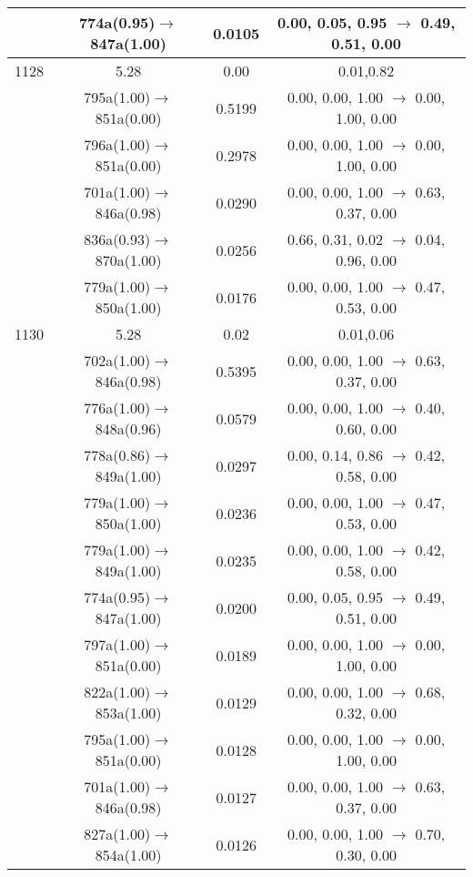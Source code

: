\documentclass[10pt,a4paper]{article}
\begin{document}
\begin{longtable}{c|c|c|c}
 	& 774a(0.95)$\rightarrow$847a(1.00) &	 0.0105 &	 0.00, 0.05, 0.95 $\rightarrow$ 0.49, 0.51, 0.00 \\ 
 \hline1128 &	 5.28 &	 0.00 &	 0.01,0.82 \\ 
  	& 795a(1.00)$\rightarrow$851a(0.00) &	 0.5199 &	 0.00, 0.00, 1.00 $\rightarrow$ 0.00, 1.00, 0.00 \\ 
 	& 796a(1.00)$\rightarrow$851a(0.00) &	 0.2978 &	 0.00, 0.00, 1.00 $\rightarrow$ 0.00, 1.00, 0.00 \\ 
 	& 701a(1.00)$\rightarrow$846a(0.98) &	 0.0290 &	 0.00, 0.00, 1.00 $\rightarrow$ 0.63, 0.37, 0.00 \\ 
 	& 836a(0.93)$\rightarrow$870a(1.00) &	 0.0256 &	 0.66, 0.31, 0.02 $\rightarrow$ 0.04, 0.96, 0.00 \\ 
 	& 779a(1.00)$\rightarrow$850a(1.00) &	 0.0176 &	 0.00, 0.00, 1.00 $\rightarrow$ 0.47, 0.53, 0.00 \\ 
 \hline1130 &	 5.28 &	 0.02 &	 0.01,0.06 \\ 
  	& 702a(1.00)$\rightarrow$846a(0.98) &	 0.5395 &	 0.00, 0.00, 1.00 $\rightarrow$ 0.63, 0.37, 0.00 \\ 
 	& 776a(1.00)$\rightarrow$848a(0.96) &	 0.0579 &	 0.00, 0.00, 1.00 $\rightarrow$ 0.40, 0.60, 0.00 \\ 
 	& 778a(0.86)$\rightarrow$849a(1.00) &	 0.0297 &	 0.00, 0.14, 0.86 $\rightarrow$ 0.42, 0.58, 0.00 \\ 
 	& 779a(1.00)$\rightarrow$850a(1.00) &	 0.0236 &	 0.00, 0.00, 1.00 $\rightarrow$ 0.47, 0.53, 0.00 \\ 
 	& 779a(1.00)$\rightarrow$849a(1.00) &	 0.0235 &	 0.00, 0.00, 1.00 $\rightarrow$ 0.42, 0.58, 0.00 \\ 
 	& 774a(0.95)$\rightarrow$847a(1.00) &	 0.0200 &	 0.00, 0.05, 0.95 $\rightarrow$ 0.49, 0.51, 0.00 \\ 
 	& 797a(1.00)$\rightarrow$851a(0.00) &	 0.0189 &	 0.00, 0.00, 1.00 $\rightarrow$ 0.00, 1.00, 0.00 \\ 
 	& 822a(1.00)$\rightarrow$853a(1.00) &	 0.0129 &	 0.00, 0.00, 1.00 $\rightarrow$ 0.68, 0.32, 0.00 \\ 
 	& 795a(1.00)$\rightarrow$851a(0.00) &	 0.0128 &	 0.00, 0.00, 1.00 $\rightarrow$ 0.00, 1.00, 0.00 \\ 
 	& 701a(1.00)$\rightarrow$846a(0.98) &	 0.0127 &	 0.00, 0.00, 1.00 $\rightarrow$ 0.63, 0.37, 0.00 \\ 
 	& 827a(1.00)$\rightarrow$854a(1.00) &	 0.0126 &	 0.00, 0.00, 1.00 $\rightarrow$ 0.70, 0.30, 0.00 \\ 

\end{longtable}
\end{document}
